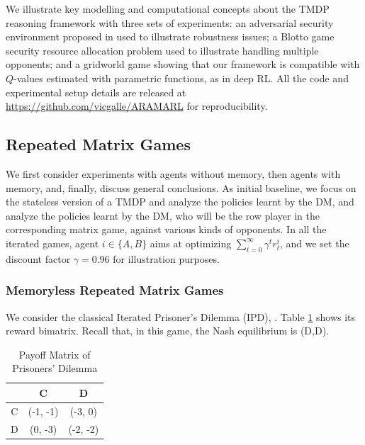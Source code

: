 We illustrate key modelling and computational concepts 
about the TMDP reasoning framework with three
sets of experiments:
an adversarial security environment proposed in \cite{leike2017ai}
used to illustrate robustness issues; a Blotto game security resource allocation problem
used to illustrate handling multiple opponents; and a %
gridworld game showing that our framework is compatible with $Q$-values estimated with parametric functions, as in deep RL. %
All the code and experimental setup details
are released at \url{https://github.com/vicgalle/ARAMARL}
 for reproducibility.

\iffalse
\subsection{Repeated Matrix Games}
We first consider experiments with agents without memory,
then agents with memory, and, finally, discuss general conclusions.
As initial baseline, we focus on the stateless version of a TMDP and
analyze the policies learnt by the DM, and analyze the policies learnt by the DM,
who will be the row player in the corresponding matrix game, against various kinds of opponents.
In all the iterated games, agent  $ i \in \lbrace A, B \rbrace $ 
aims at optimizing 
$\sum_{t=0}^{\infty} \gamma^t r^i_{t}$, and we set 
the discount factor $\gamma = 0.96$ for illustration purposes. 
\subsubsection{Memoryless Repeated Matrix Games}\label{kk2}

We consider the classical Iterated Prisoner's Dilemma (IPD), \cite{axelrod84}. Table \ref{tab:payoffIPD} shows its reward bimatrix. %
 Recall that, in this game, the Nash equilibrium is (D,D).

\begin{table}[h]
\begin{center}
\begin{tabular}{c|c|c}
\hline
 & C & D \\
\hline
C & (-1, -1) & (-3, 0) \\
\hline
D & (0, -3) & (-2, -2)  \\
\hline
\end{tabular}
\end{center}
\caption{Payoff Matrix of Prisoners' Dilemma}
\label{tab:payoffIPD}
\vspace{-2ex}
\end{table}

